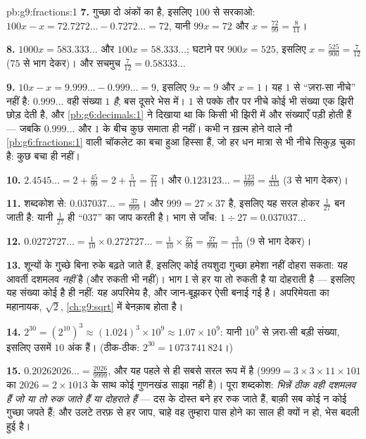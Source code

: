 \begin{solution}{pb:g9:fractions:1}
\textbf{7.} गुच्छा दो अंकों का है, इसलिए $100$ से सरकाओ:
$100x - x = 72.7272\ldots - 0.7272\ldots = 72$, यानी
$99x = 72$ और $x = \frac{72}{99} = \frac{8}{11}$।

\textbf{8.} $1000x = 583.333\ldots$ और $100x = 58.333\ldots$;
घटाने पर $900x = 525$, इसलिए
$x = \frac{525}{900} = \frac{7}{12}$ ($75$ से भाग देकर)। और सचमुच
$\frac{7}{12} = 0.58333\ldots$

\textbf{9.} $10x - x = 9.999\ldots - 0.999\ldots = 9$, इसलिए
$9x = 9$ और $x = 1$। यह $1$ से ``ज़रा-सा नीचे'' नहीं है:
$0.999\ldots$ वही संख्या $1$ \emph{है}, बस दूसरे भेस में। $1$ से
पक्के तौर पर नीचे कोई भी संख्या एक झिरी छोड़ देती है, और
\cref{pb:g6:decimals:1} ने दिखाया था कि किसी भी झिरी में और
संख्याएँ पड़ी होती हैं --- जबकि $0.999\ldots$ और $1$ के बीच कुछ
समाता ही नहीं। कभी न ख़त्म होने वाले नौ
\cref{pb:g6:fractions:1} वाली चॉकलेट का बचा हुआ हिस्सा हैं, जो हर
धन मात्रा से भी नीचे सिकुड़ चुका है: कुछ बचा ही नहीं।

\textbf{10.} $2.4545\ldots = 2 + \frac{45}{99} = 2 +
\frac{5}{11} = \frac{27}{11}$। और
$0.123123\ldots = \frac{123}{999} = \frac{41}{333}$ ($3$ से भाग
देकर)।

\textbf{11.} शब्दकोश से: $0.037037\ldots = \frac{37}{999}$। और
$999 = 27 \times 37$ है, इसलिए यह सरल होकर $\frac{1}{27}$ बन जाती
है: यानी  $\frac{1}{27}$ ही ``$037$'' का जाप करती है। भाग से
जाँच: $1 \div 27 = 0.037037\ldots$

\textbf{12.} $0.0272727\ldots = \frac{1}{10} \times
0.272727\ldots = \frac{1}{10} \times \frac{27}{99}
= \frac{27}{990} = \frac{3}{110}$ ($9$ से भाग देकर)।

\textbf{13.} शून्यों के गुच्छे बिना रुके बढ़ते जाते हैं, इसलिए कोई
तयशुदा गुच्छा हमेशा नहीं दोहरा सकता: यह आवर्ती दशमलव \emph{नहीं}
है (और रुकती भी नहीं)। भाग I से हर  या तो रुकती है या दोहराती
है --- इसलिए यह संख्या कोई  है ही नहीं: यह अपरिमेय है, और
जान-बूझकर ऐसी बनाई गई है। अपरिमेयता का महानायक, $\sqrt2$,
\cref{ch:g9:sqrt} में बेनक़ाब होता है।

\textbf{14.} $2^{30} = \left(2^{10}\right)^3 \approx
(1.024)^3 \times 10^9 \approx 1.07 \times 10^9$: यानी $10^9$ से
ज़रा-सी बड़ी संख्या, इसलिए उसमें $10$ अंक हैं। (ठीक-ठीक:
$2^{30} = 1\,073\,741\,824$।)

\textbf{15.} $0.20262026\ldots = \frac{2026}{9999}$, और यह पहले से
ही सबसे सरल रूप में है ($9999 = 3 \times 3 \times 11 \times 101$
का $2026 = 2 \times 1013$ के साथ कोई गुणनखंड साझा नहीं है)। पूरा
शब्दकोश: \emph{भिन्नें ठीक वही दशमलव हैं जो या तो रुक जाते हैं या
दोहराते हैं} --- दस के दोस्त बने हर रुक जाते हैं, बाक़ी सब कोई न कोई
गुच्छा जपते हैं; और उलटे तरफ़ से हर जाप, चाहे वह तुम्हारा पास होने
का साल ही क्यों न हो, भेस बदली हुई  है।

\end{solution}
